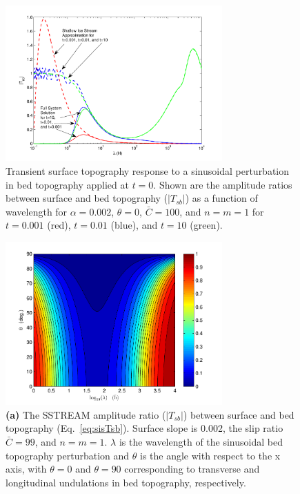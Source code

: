 \documentclass[10pt,a4paper]{book}
\newcommand{\T}{T}
\begin{document}
\begin{figure}
\vspace*{2mm}
\centerline{
\includegraphics[width=8.3cm]{tc-2007-0016-f05.pdf}}
\caption{Transient surface topography response to a sinusoidal 
perturbation in bed topography applied at $t{=}0$. Shown are the
amplitude ratios between surface and bed topography ($|T_{sb}|$)
as a function of wavelength for $\alpha{=}0.002$, $\theta{=}0$,
$\bar{C}{=}100$, and $n=m=1$ for $t{=}0.001$ (red), $t{=}0.01$ (blue),
and $t{=}10$ (green).
\label{fig:Tsbtrans}}
\end{figure}




\begin{figure}
\vspace*{2mm}
\centerline{\includegraphics[width=8.3cm]{tc-2007-0016-f06a.pdf}}
\caption{{\bf (a)} The SSTREAM amplitude ratio  ($|\T_{sb}|$) between
surface and bed topography (Eq.~\ref{eq:sisTsb}).  Surface slope
is 0.002, the slip ratio $\bar{C}{=}99$, and $n=m=1$.  $\lambda$ is
the wavelength of the sinusoidal bed topography perturbation and $\theta$ is
the angle with respect to the x axis, with $\theta{=}0$ and
$\theta{=}90$ corresponding to transverse and longitudinal 
undulations in bed topography, respectively.
\label{fig:SISA_Tsb_kl_ss_100_0k002}}
\end{figure}
\end{document}

